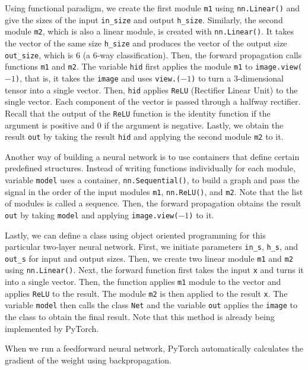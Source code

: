 Using functional paradigm, we create the first module \texttt{m1} using \texttt{nn.Linear()} and give the sizes of the input \texttt{in\_size} and output \texttt{h\_size}.
Similarly, the second module \texttt{m2}, which is also a linear module, is created with \texttt{nn.Linear()}.
It takes the vector of the same size \texttt{h\_size} and produces the vector of the output size \texttt{out\_size}, which is $6$ (a $6$-way classification).
Then, the forward propagation calls functions \texttt{m1} and \texttt{m2}.
The variable \texttt{hid} first applies the module \texttt{m1} to \texttt{image.view($-1$)}, that is, it takes the \texttt{image} and uses \texttt{view.($-1$)} to turn a $3$-dimensional tensor into a single vector.
Then, \texttt{hid} applies \texttt{ReLU} (Rectifier Linear Unit) to the single vector.
Each component of the vector is passed through a halfway rectifier.
Recall that the output of the \texttt{ReLU} function is the identity function if the argument is positive and $0$ if the argument is negative.
Lastly, we obtain the result \texttt{out} by taking the result \texttt{hid} and applying the second module \texttt{m2} to it.

Another way of building a neural network is to use containers that define certain predefined structures.
Instead of writing functions individually for each module, variable \texttt{model} uses a container, \texttt{nn.Sequential()}, to build a graph and pass the signal in the order of the input modules \texttt{m1}, \texttt{nn.ReLU()}, and \texttt{m2}.
Note that the list of modules is called a sequence.
Then, the forward propagation obtains the result \texttt{out} by taking \texttt{model} and applying \texttt{image.view($-1$)} to it.

Lastly, we can define a class using object oriented programming for this particular two-layer neural network.
First, we initiate parameters \texttt{in\_s}, \texttt{h\_s}, and \texttt{out\_s} for input and output sizes.
Then, we create two linear module \texttt{m1} and \texttt{m2} using \texttt{nn.Linear()}.
Next, the forward function first takes the input \texttt{x} and turns it into a single vector.
Then, the function applies \texttt{m1} module to the vector and applies \texttt{ReLU} to the result.
The module \texttt{m2} is then applied to the result \texttt{x}.
The variable \texttt{model} then calls the class \texttt{Net} and the variable \texttt{out} applies the \texttt{image} to the class to obtain the final result.
Note that this method is already being implemented by PyTorch.

When we run a feedforward neural network, PyTorch automatically calculates the gradient of the weight using backpropagation.
